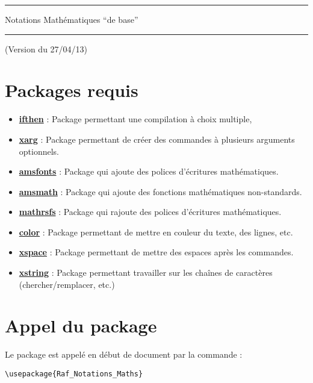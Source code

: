 \documentclass[a4paper,10pt]{article}
\begin{document}
	\begin{center}
		\hrule{\Large Notations Mathématiques ``de base''}\\\hrule
	\end{center}

	(Version du 27/04/13)

	\section{Packages requis}

	\begin{itemize}
		\item \href{http://www.ctan.org/pkg/ifthen}{\textbf{ifthen}} : Package permettant une compilation à choix multiple,
		\item \href{http://tug.ctan.org/tex-archive/macros/latex/contrib/xargs}{\textbf{xarg}} : Package permettant de créer des commandes à plusieurs arguments optionnels.
		\item \href{http://www.ams.org/publications/authors/tex/amsfonts}{\textbf{amsfonts}} : Package qui ajoute des polices d'écritures mathématiques.
		\item \href{http://www.ams.org/publications/authors/tex/amslatex}{\textbf{amsmath}} : Package qui ajoute des fonctions mathématiques non-standards.
		\item \href{http://www.ctan.org/pkg/mathrsfs}{\textbf{mathrsfs}} : Package qui rajoute des polices d'écritures mathématiques.
		\item \href{http://www.ctan.org/pkg/color}{\textbf{color}} : Package permettant de mettre en couleur du texte, des lignes, etc.
		\item \href{http://www.ctan.org/pkg/xspace}{\textbf{xspace}} : Package permettant de mettre des espaces après les commandes.
		\item \href{http://www.ctan.org/pkg/xstring}{\textbf{xstring}} : Package permettant travailler sur les chaînes de caractères (chercher/remplacer, etc.)
	\end{itemize}

	\section{Appel du package}

	Le package est appelé en début de document par la commande :
	\begin{verbatim}
\usepackage{Raf_Notations_Maths}
	\end{verbatim}
\end{document}
